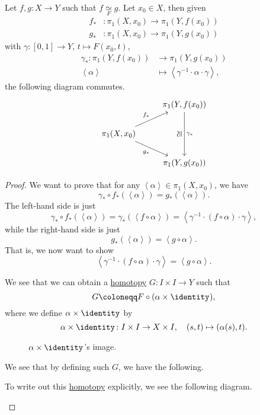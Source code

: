 \begin{lemma}
	Let \(f, g\colon X\to Y\) such that \(f \underset{F}{\simeq }g \). Let \(x_0\in X\), then given
	\[
		\begin{split}
			f_\ast &\colon \pi _1(X, x_0)\to \pi _1(Y, f(x_0))\\
			g_\ast &\colon \pi _1(X, x_0)\to \pi _1(Y, g(x_0))
		\end{split}
	\]
	with \(\gamma \colon [0, 1]\to Y\), \(t\mapsto F(x_0, t)\),
	\[
		\begin{split}
			\gamma _\ast \colon \pi _1(Y, f(x_0))&\to \pi _1(Y, g(x_0))\\
			\left< \alpha  \right> &\mapsto \left< \gamma ^{-1} \cdot \alpha \cdot \gamma  \right>,
		\end{split}
	\]
	the following diagram commutes.
	\[
		\begin{tikzcd}
			& {\pi_1(Y, f(x_0))} \\
			{\pi_1(X, x_0)} \\
			& {\pi_1(Y, g(x_0))}
			\arrow["{\gamma_\ast}", from=1-2, to=3-2]
			\arrow["\cong"{marking}, shift left=2, draw=none, from=3-2, to=1-2]
			\arrow["{f_\ast}", from=2-1, to=1-2]
			\arrow["g_\ast"', from=2-1, to=3-2]
		\end{tikzcd}
	\]
\end{lemma}
\begin{proof}
	We want to prove that for any \(\left< \alpha  \right> \in \pi _1(X, x_0)\), we have
	\[
		\gamma _\ast \circ f_\ast(\left< \alpha  \right> ) = g_\ast (\left< \alpha  \right> ).
	\]
	The left-hand side is just
	\[
		\gamma _\ast \circ f_\ast (\left< \alpha  \right> )= \gamma _\ast \left(\left< f\circ \alpha  \right> \right) = \left< \gamma ^{-1} \cdot \left(f\circ \alpha \right)\cdot \gamma  \right>,
	\]
	while the right-hand side is just
	\[
		g_\ast (\left< \alpha  \right> )= \left< g\circ \alpha  \right>.
	\]
	That is, we now want to show
	\[
		\left< \gamma ^{-1} \cdot (f\circ \alpha ) \cdot \gamma \right> = \left< g\circ \alpha  \right>.
	\]

	\begin{center}
	\end{center}
	We see that we can obtain a \hyperref[def:homotopy]{homotopy} \(G\colon I\times I\to Y\) such that
	\[
		G\coloneqq F\circ (\alpha \times \identity_{}),
	\]
	where we define \(\alpha \times \identity_{} \) by
	\[
		\alpha \times \identity_{} \colon I\times I\to X\times I,\quad (s, t)\mapsto (\alpha (s), t).
	\]
	\begin{figure}[H]
		\centering
		\caption{\(\alpha\times\identity_{} \)'s image.}
		\label{fig:pf:lma:lec9-2}
	\end{figure}
	We see that by defining such \(G\), we have the following.
	\begin{center}
	\end{center}
	To write out this \hyperref[def:homotopy]{homotopy} explicitly, we see the following diagram.
	\begin{center}
	\end{center}
\end{proof}

